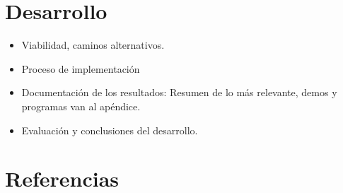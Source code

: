 \begin{multicols}{2}
\section{Desarrollo}
\begin{itemize}
	\item Viabilidad, caminos alternativos.
	\item Proceso de implementación
	\item Documentación de los resultados: Resumen de lo más relevante, demos y programas van al apéndice.
	\item Evaluación y conclusiones del desarrollo.
\end{itemize}

\section{Referencias}

\end{multicols}

